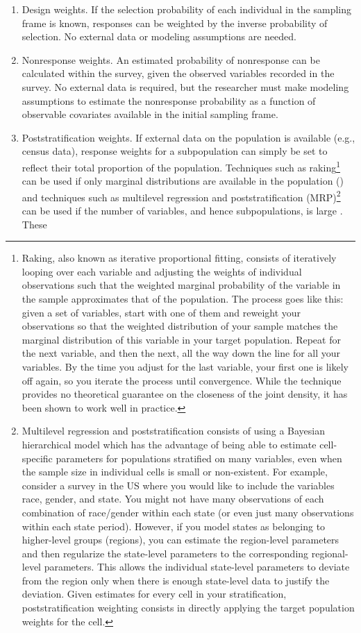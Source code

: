 \documentclass[a4paper,12pt]{article}
\theoremstyle{proposition}
\begin{document}
\begin{enumerate}
\item Design weights. If the selection probability of each individual in the sampling frame is known, responses can be weighted by the inverse probability of selection. No external data or modeling assumptions are needed.

\item Nonresponse weights. An estimated probability of nonresponse can be calculated within the survey, given the observed variables recorded in the survey. No external data is required, but the researcher must make modeling assumptions to estimate the nonresponse probability as a function of observable covariates available in the initial sampling frame.

\item Poststratification weights. If external data on the population is available (e.g., census data), response weights for a subpopulation can simply be set to reflect their total proportion of the population. Techniques such as raking\footnote{Raking, also known as iterative proportional fitting, consists of iteratively looping over each variable and adjusting the weights of individual observations such that the weighted marginal probability of the variable in the sample approximates that of the population. The process goes like this: given a set of variables, start with one of them and reweight your observations so that the weighted distribution of your sample matches the marginal distribution of this variable in your target population. Repeat for the next variable, and then the next, all the way down the line for all your variables. By the time you adjust for the last variable, your first one is likely off again, so you iterate the process until convergence. While the technique provides no theoretical guarantee on the closeness of the joint density, it has been shown to work well in practice.} can be used if only marginal distributions are available in the population (\cite{Deville1992,Battaglia2009}) and techniques such as multilevel regression and poststratification (MRP)\footnote{Multilevel regression and poststratification consists of using a Bayesian hierarchical model which has the advantage of being able to estimate cell-specific parameters for populations stratified on many variables, even when the sample size in individual cells is small or non-existent. For example, consider a survey in the US where you would like to include the variables race, gender, and state. You might not have many observations of each combination of race/gender within each state (or even just many observations within each state period). However, if you model states as belonging to higher-level groups (regions), you can estimate the region-level parameters and then regularize the state-level parameters to the corresponding regional-level parameters. This allows the individual state-level parameters to deviate from the region only when there is enough state-level data to justify the deviation. Given estimates for every cell in your stratification, poststratification weighting consists in directly applying the target population weights for the cell.} can be used if the number of variables, and hence subpopulations, is large \parencite{Gelman1997}. These 
\end{enumerate}
\end{document}
